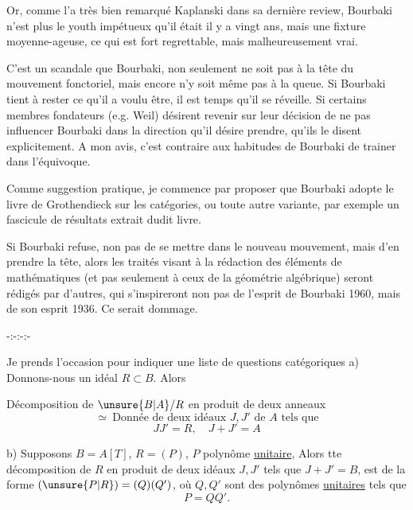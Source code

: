 Or, comme l'a très bien remarqué Kaplanski dans sa dernière review, Bourbaki n'est plus le youth impétueux qu'il était il y a vingt ans, mais une fixture moyenne-ageuse, ce qui est fort regrettable, mais malheureusement vrai.

C'est un scandale que Bourbaki, non seulement ne soit pas à la tête du mouvement fonctoriel, mais encore n'y soit même pas à la queue. Si Bourbaki tient à rester ce qu'il a voulu être, il est temps qu'il se réveille. Si certains membres fondateurs (e.g. Weil) désirent revenir sur leur décision de ne pas influencer Bourbaki dans la direction qu'il désire prendre, qu'ils le disent explicitement. A mon avis, c'est contraire aux habitudes de Bourbaki de trainer dans l'équivoque.

Comme suggestion pratique, je commence par proposer que Bourbaki adopte le livre de Grothendieck sur les catégories, ou toute autre variante, par exemple un fascicule de résultats extrait dudit livre.

Si Bourbaki refuse, non pas de se mettre dans le nouveau mouvement, mais d'en prendre la tête, alors les traités visant à la rédaction des éléments de mathématiques (et pas seulement à ceux de la géométrie algébrique) seront rédigés par d'autres, qui s'inspireront non pas de l'esprit de Bourbaki 1960, mais de son esprit 1936. Ce serait dommage.

\begin{center}-:-:-:-\end{center}

Je prends l'occasion pour indiquer une liste de questions catégoriques
a) Donnons-nous un idéal $R\subset B$. Alors

Décomposition de $\unsure{B|A}/R$ en produit de deux anneaux
\[
\simeq\ \text{Donnée de deux idéaux }J,J'\text{ de }A\text{ tels que}
\]
\[
JJ'=R,\quad J+J'=A
\]
\margin{[Car $J+J'=A\Rightarrow JJ'=J\cap J'$]}

b) Supposons $B=A[T]$,  $R=(P)$, $P$ polynôme \uline{unitaire}, Alors tte décomposition de $R$ en produit de deux idéaux $J,J'$ tels que $J+J'=B$, est  de la forme $(\unsure{P|R})=(Q)(Q')$, où $Q,Q'$ sont des polynômes \uline{unitaires} tels que
\[
P=QQ'.
\]

